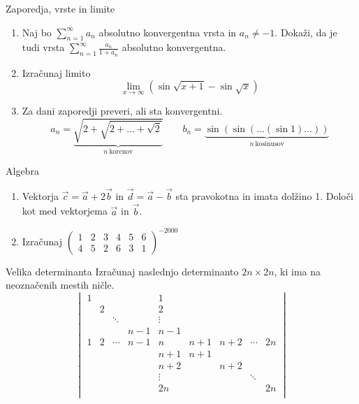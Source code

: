\begin{frame}{Zaporedja, vrste in limite}
	\begin{enumerate}
		\item 
		Naj bo $\sum_{n=1}^\infty {a_n}$ absolutno konvergentna vrsta in $a_n \ne -1$.
		Dokaži, da je tudi vrsta $\sum_{n=1}^\infty \frac{a_n}{1+a_n}$
		absolutno konvergentna.

		\item
		Izračunaj limito
		$$\lim_{x \to\infty}{(\sin\sqrt{x+1} - \sin\sqrt{x})}$$

		\item
		Za dani zaporedji preveri, ali sta konvergentni.
		$$
		a_n = \underbrace{\sqrt{2+\sqrt{2+\dots+\sqrt{2}}}}_{n~\text{korenov}} \qquad
		b_n = \underbrace{\sin(\sin(\dots(\sin 1)\dots))}_{n~\text{kosinusov}}
		$$
	\end{enumerate}
\end{frame}

\begin{frame}{Algebra}
	\begin{enumerate}
		\item
		Vektorja $\vec{c} = \vec{a} + 2\vec{b}$ in $\vec{d} = \vec{a} - \vec{b}$
		sta pravokotna in imata dolžino 1. Določi kot med vektorjema $\vec{a}$ in $\vec{b}$.
		\item 
		Izračunaj
		$\begin{pmatrix}
			1 & 2 & 3 & 4 & 5 & 6 \\
			4 & 5 & 2 & 6 & 3 & 1
		\end{pmatrix}^{-2000}$
	\end{enumerate}
\end{frame}

\begin{frame}{Velika determinanta}
	Izračunaj naslednjo determinanto $2n \times 2n$, ki ima na neoznačenih mestih ničle.
	$$\begin{vmatrix}
		1 & & & & 1\\
		& 2 & & & 2\\
		& & \ddots & & \vdots\\
		& & & n-1 & n-1\\
		1 & 2 & \cdots & n-1 & n & n+1 & n+2 & \cdots &2n\\
		& & & & n+1 & n+1\\
		& & & & n+2 &  & n+2\\
		& & & & \vdots &  & & \ddots\\
		& & & & 2n&  & & & 2n\\
	\end{vmatrix}$$
\end{frame}

